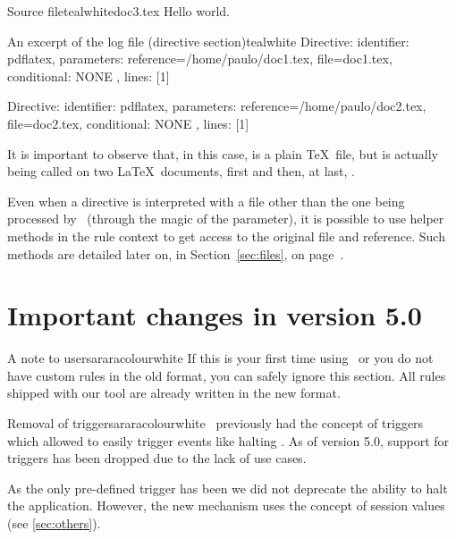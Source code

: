 \begin{ncodebox}{Source file}{teal}{\icnote}{white}{doc3.tex}
Hello world.
\bye
\end{ncodebox}

\begin{codebox}{An excerpt of the log file (directive section)}{teal}{\icnote}{white}
Directive: { identifier: pdflatex, parameters:
{reference=/home/paulo/doc1.tex, file=doc1.tex},
conditional: { NONE }, lines: [1] }

Directive: { identifier: pdflatex, parameters:
{reference=/home/paulo/doc2.tex, file=doc2.tex},
conditional: { NONE }, lines: [1] }
\end{codebox}

It is important to observe that, in this case,  is a plain \TeX\ file, but  is actually being called on two \LaTeX\ documents, first  and then, at last, .

Even when a directive is interpreted with a file other than the one being processed by \arara\ (through the magic of the  parameter), it is possible to use helper methods in the rule context to get access to the original file and reference. Such methods are detailed later on, in Section~\ref{sec:files}, on page~\pageref{sec:files}.

\section{Important changes in version 5.0}
\label{sec:migrationguide}

\begin{messagebox}{A note to users}{araracolour}{\icattention}{white}
If this is your first time using \arara\ or you do not have custom rules in the old format, you can safely ignore this section. All rules shipped with our tool are already written in the new format.
\end{messagebox}

\begin{messagebox}{Removal of triggers}{araracolour}{\icattention}{white}
\arara\ previously had the concept of triggers which allowed to easily trigger events like halting \arara. As of version 5.0, support for triggers has been dropped due to the lack of use cases.

As the only pre-defined trigger has been  we did not deprecate the ability to halt the application. However, the new mechanism uses the concept of session values (see \autoref{sec:others}).
\end{messagebox}

